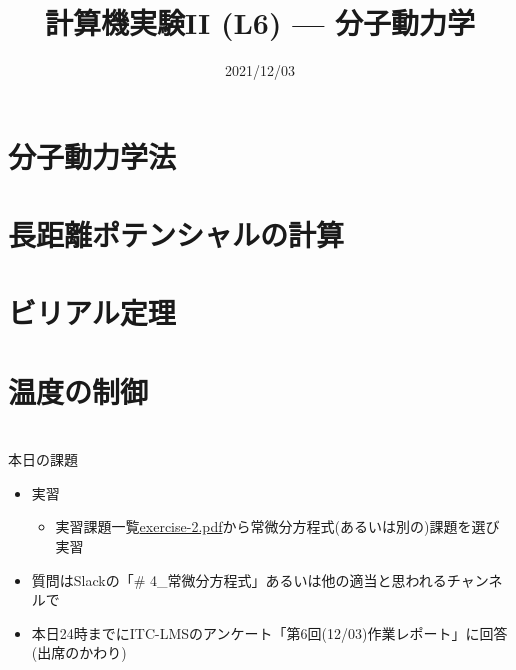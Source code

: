 \documentclass[10pt,dvipdfmx]{beamer}
\title{計算機実験II (L6) --- 分子動力学}
\date{2021/12/03}
\begin{document}
\begin{frame}
  \titlepage
  \tableofcontents
\end{frame}

\section{分子動力学法}





\section{長距離ポテンシャルの計算}






\section{ビリアル定理}





\section{温度の制御}








%




\section{}



\begin{frame}[t]{本日の課題}
  \begin{itemize}
  \item 実習
    \begin{itemize}
    \item 実習課題一覧\href{https://github.com/todo-group/ComputerExperiments/releases/tag/2021a-computer2}{exercise-2.pdf}から常微分方程式(あるいは別の)課題を選び実習
    \end{itemize}
  \item 質問はSlackの「\# 4\_常微分方程式」あるいは他の適当と思われるチャンネルで
  \item 本日24時までにITC-LMSのアンケート「第6回(12/03)作業レポート」に回答(出席のかわり)
  \end{itemize}
\end{frame}
\end{document}
